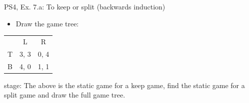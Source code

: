 \begin{frame}{PS4, Ex. 7.a: To keep or split (backwards induction)}
  \begin{multicols}{2}
    \begin{itemize}
      \item[(a)] Draw the game tree:
    \end{itemize}
    \begin{table}
    \begin{tabular}{l|c|c|}
    \multicolumn{1}{c}{} & \multicolumn{1}{c}{L} & \multicolumn{1}{c}{R} \\\cline{2-3}
    T & 3, 3 & 0, 4 \\\cline{2-3}
    B & 4, 0 & 1, 1 \\\cline{2-3}
    \end{tabular}
    \end{table}
     stage: The above is the static game for a keep game, find the static game for a  split game and draw the full game tree.
  \vfill\null \columnbreak
  \vfill\null
  \end{multicols}
\end{frame}
